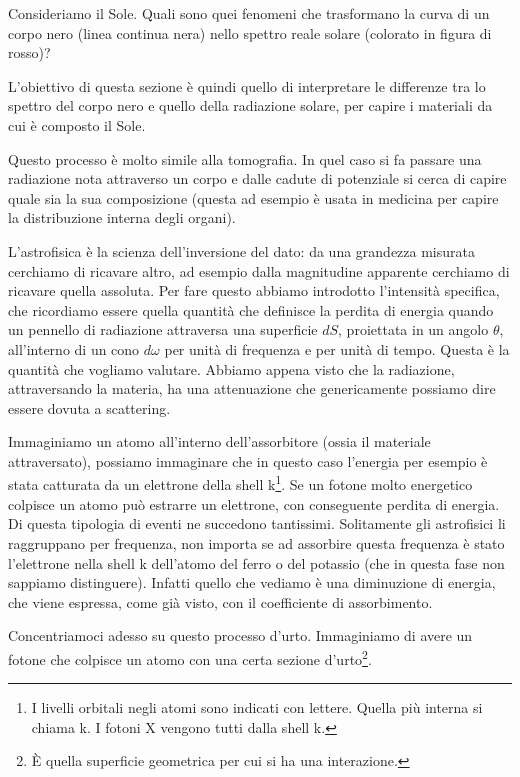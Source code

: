 Consideriamo il Sole. Quali sono quei fenomeni che trasformano la curva di un corpo nero (linea continua nera) nello spettro reale solare (colorato in figura di rosso)?

L'obiettivo di questa sezione è quindi quello di interpretare le differenze tra lo spettro del corpo nero e quello della radiazione solare, per capire i materiali da cui è composto il Sole.

Questo processo è molto simile alla tomografia. In quel caso si fa passare una radiazione nota attraverso un corpo e dalle cadute di potenziale si cerca di capire quale sia la sua composizione (questa ad esempio è usata in medicina per capire la distribuzione interna degli organi).

L'astrofisica è la scienza dell'inversione del dato: da una grandezza misurata cerchiamo di ricavare altro, ad esempio dalla magnitudine apparente cerchiamo di ricavare quella assoluta. Per fare questo abbiamo introdotto l'intensità specifica, che ricordiamo essere quella quantità che definisce la perdita di energia quando un pennello di radiazione attraversa una superficie $dS$, proiettata in un angolo $\theta$, all'interno di un cono $d\omega$ per unità di frequenza e per unità di tempo. Questa è la quantità che vogliamo valutare. Abbiamo appena visto che la radiazione, attraversando la materia, ha una attenuazione che genericamente possiamo dire essere dovuta a scattering.

Immaginiamo un atomo all'interno dell'assorbitore (ossia il materiale attraversato), possiamo immaginare che in questo caso l'energia per esempio è stata catturata da un elettrone della shell k\footnote{I livelli orbitali negli atomi sono indicati con lettere. Quella più interna si chiama k. I fotoni X vengono tutti dalla shell k.}. Se un fotone molto energetico colpisce un atomo può estrarre un elettrone, con conseguente perdita di energia. Di questa tipologia di eventi ne succedono tantissimi. Solitamente gli astrofisici li raggruppano per frequenza, non importa se ad assorbire questa frequenza è stato l'elettrone nella shell k dell'atomo del ferro o del potassio (che in questa fase non sappiamo distinguere). Infatti quello che vediamo è una diminuzione di energia, che viene espressa, come già visto, con il coefficiente di assorbimento.

Concentriamoci adesso su questo processo d'urto. Immaginiamo di avere un fotone che colpisce un atomo con una certa sezione d'urto\footnote{È quella superficie geometrica per cui si ha una interazione.}.

